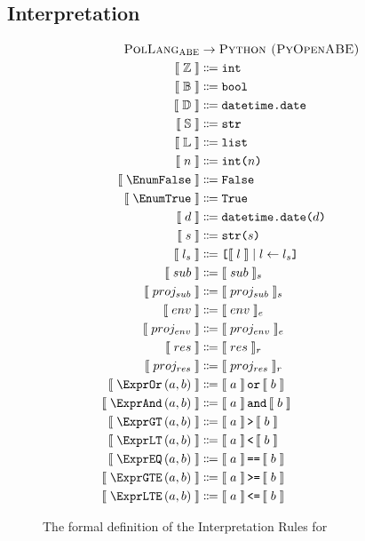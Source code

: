 \subsection{Interpretation}
\label{subsec:interpretation}

\begin{figure}[ht]
  \centering
\begin{align*}
  \textsc{\thePolicyLang}&\rightarrow\textsc{Python (PyOpenABE)}\\
  \interpB{\TyInt}&\Coloneqq\text{\ttfamily int}\\
  \interpB{\mathbb{B}}&\Coloneqq\text{\ttfamily bool}\\
  \interpB{\mathbb{D}}&\Coloneqq\text{\ttfamily datetime.date}\\
  \interpB{\mathbb{S}}&\Coloneqq\text{\ttfamily str}\\
  \interpB{\mathbb{L}}&\Coloneqq\text{\ttfamily list}\\
  \interpB{n}&\Coloneqq\text{\ttfamily int(}n\text{\ttfamily)}\\
  \interpB{\EnumFalse}&\Coloneqq\text{\ttfamily False}\\
  \interpB{\EnumTrue} &\Coloneqq\text{\ttfamily True}\\
  \interpB{d}&\Coloneqq\text{\ttfamily datetime.date(}d\text{\ttfamily)}\\
  \interpB{s}&\Coloneqq\text{\ttfamily str(}s\text{\ttfamily)}\\
  \interpB{l_s}&\Coloneqq\text{\ttfamily [}\interpB{l}\alt l \leftarrow l_s\text{\ttfamily]}\\
  \interpB{sub}&\Coloneqq\interpB{sub}_{s}\\
  \interpB{proj_{sub}}&\Coloneqq\interpB{proj_{sub}}_{s}\\
  \interpB{env}&\Coloneqq\interpB{env}_{e}\\
  \interpB{proj_{env}}&\Coloneqq\interpB{proj_{env}}_{e}\\
  \interpB{res}&\Coloneqq\interpB{res}_{r}\\
  \interpB{proj_{res}}&\Coloneqq\interpB{proj_{res}}_{r}\\
  \interpB{\exprOr{a}{b}}  &\Coloneqq\interpB{a}\,\text{\ttfamily or}\,\interpB{b}\\
  \interpB{\exprAnd{a}{b}} &\Coloneqq\interpB{a}\,\text{\ttfamily and}\,\interpB{b}\\
  \interpB{\exprGT{a}{b}}  &\Coloneqq\interpB{a}\,\text{\ttfamily \textgreater}\,\interpB{b}\\
  \interpB{\exprLT{a}{b}}  &\Coloneqq\interpB{a}\,\text{\ttfamily \textless}\,\interpB{b}\\
  \interpB{\exprEQ{a}{b}}  &\Coloneqq\interpB{a}\,\text{\ttfamily ==}\,\interpB{b}\\
  \interpB{\exprGTE{a}{b}}  &\Coloneqq\interpB{a}\,\text{\ttfamily \textgreater =}\,\interpB{b}\\
  \interpB{\exprLTE{a}{b}}  &\Coloneqq\interpB{a}\,\text{\ttfamily \textless =}\,\interpB{b}
\end{align*}
  \caption{\label{fig:interp}The formal definition of the Interpretation Rules for \thePolicyLang}
\end{figure}

